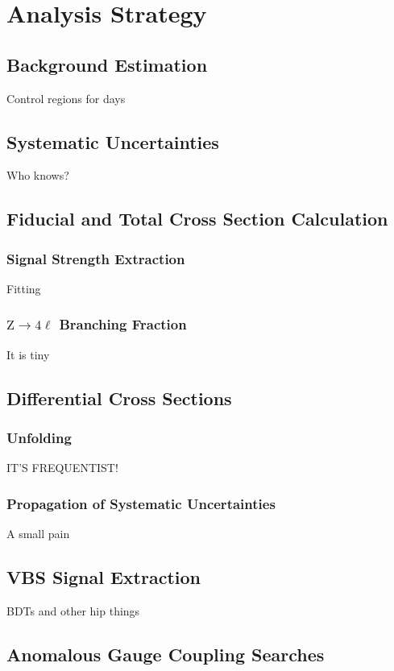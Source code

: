\chapter{Analysis Strategy}

\section{Background Estimation}
Control regions for days



\section{Systematic Uncertainties}
Who knows?



\section{Fiducial and Total Cross Section Calculation}

\subsection{Signal Strength Extraction}
Fitting


\subsection{\texorpdfstring{$\mathrm{Z} \to 4\ell$}{Z to 4l} Branching Fraction}
It is tiny



\section{Differential Cross Sections}

\subsection{Unfolding}
IT'S FREQUENTIST\@!


\subsection{Propagation of Systematic Uncertainties}
A small pain



\section{VBS Signal Extraction}
BDTs and other hip things



\section{Anomalous Gauge Coupling Searches}
